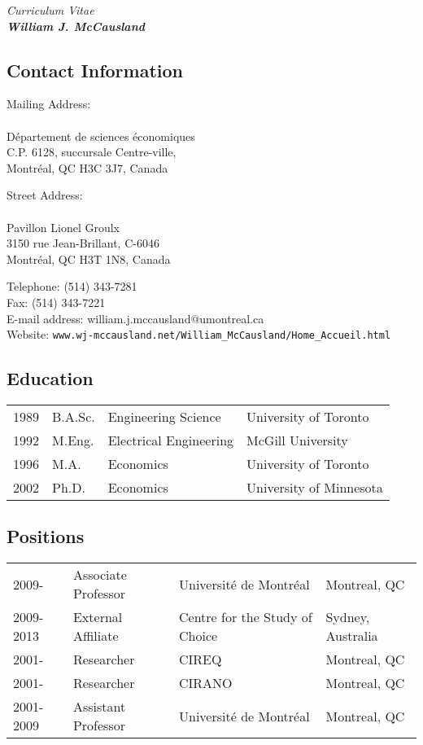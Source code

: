 \documentclass[12pt]{article}
\begin{document}
{\large
\begin{center}
\it{Curriculum Vitae}\\
\bf{William J. McCausland}\\
\end{center}
}

\subsection*{Contact Information}

\parbox{8cm}{
Mailing Address: \\
\\
D\'epartement de sciences \'economiques \\
C.P. 6128, succursale Centre-ville, \\
Montr\'eal, QC H3C 3J7, Canada \\
}
\parbox{7cm}{
Street Address: \\
\\
Pavillon Lionel Groulx \\
3150 rue Jean-Brillant, C-6046 \\
Montr\'eal, QC H3T 1N8, Canada \\
}

Telephone:  (514) 343-7281 \\
Fax:  (514) 343-7221 \\
E-mail address:  william.j.mccausland@umontreal.ca \\
Website: \verb+www.wj-mccausland.net/William_McCausland/Home_Accueil.html+

\subsection*{Education}

\begin{tabular}{llll}
1989 & B.A.Sc. & Engineering Science & University of Toronto \\
1992 & M.Eng. & Electrical Engineering & McGill University \\
1996 & M.A. & Economics & University of Toronto \\
2002 & Ph.D. & Economics & University of Minnesota \\
\end{tabular}

\subsection*{Positions}

\begin{tabular}{llll}
2009- & Associate Professor & Universit\'e de Montr\'eal & Montreal, QC\\
2009-2013 & External Affiliate & Centre for the Study of Choice & Sydney, Australia\\
2001- & Researcher & CIREQ & Montreal, QC\\
2001- & Researcher & CIRANO & Montreal, QC\\
2001-2009 & Assistant Professor & Universit\'e de Montr\'eal & Montreal, QC\\
\end{tabular}
\end{document}
